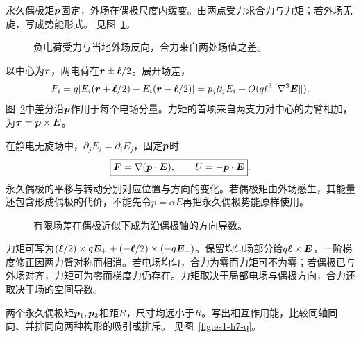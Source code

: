\begin{exercise}[偶极在不均匀场中]\label{ex:es1-h6}
永久偶极矩$\bm{p}$固定，外场在偶极尺度内缓变。由两点受力求合力与力矩；若外场无旋，写成势能形式。 见图~\ref{fig:es1-h6-q}。
\end{exercise}

\begin{figure}[H]\centering
{}
\caption{负电荷受力与当地外场反向，合力来自两处场值之差。}\label{fig:es1-h6-q}
\end{figure}
\begin{solution}
以中心为$\bm{r}$，两电荷在$\bm{r}\pm\bm{\ell}/2$。展开场差，
\[F_i=q[E_i(\bm{r}+\bm{\ell}/2)-E_i(\bm{r}-\bm{\ell}/2)]
=p_j\partial_jE_i+O(q\ell^3\|\nabla^3\bm{E}\|).\]
图~\ref{fig:es1-h6-s}中差分沿$\bm{p}$作用于每个电场分量。力矩的首项来自两支力对中心的力臂相加，为$\bm{\tau}=\bm{p}\times\bm{E}$。

在静电无旋场中，$\partial_jE_i=\partial_iE_j$，固定$\bm{p}$时
\[\boxed{\bm{F}=\nabla(\bm{p}\cdot\bm{E}),\qquad U=-\bm{p}\cdot\bm{E}}.\]
永久偶极的平移与转动分别对应位置与方向的变化。若偶极矩由外场感生，其能量还包含形成偶极的代价，不能先令$p=\alpha E$再把永久偶极势能原样使用。
\begin{figure}[H]\centering
{}
\caption{有限场差在偶极近似下成为沿偶极轴的方向导数。}\label{fig:es1-h6-s}
\end{figure}


力矩可写为$(\bm{\ell}/2)\times q\bm{E}_++(-\bm{\ell}/2)\times(-q\bm{E}_-)$。保留均匀场部分给$q\bm{\ell}\times\bm{E}$，一阶梯度修正因两力臂对称而相消。若电场均匀，合力为零而力矩可不为零；若偶极已与外场对齐，力矩可为零而梯度力仍存在。力矩取决于局部电场与偶极方向，合力还取决于场的空间导数。
\end{solution}

\begin{exercise}[两偶极的角度与作用能]\label{ex:es1-h7}
两个永久偶极矩$\bm{p}_1,\bm{p}_2$相距$R$，尺寸均远小于$R$。写出相互作用能，比较同轴同向、并排同向两种构形的吸引或排斥。 见图~\ref{fig:es1-h7-q}。
\end{exercise}

